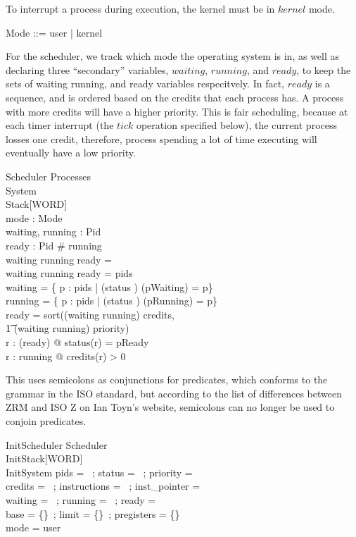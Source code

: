 \documentclass{article}
\begin{document}
To interrupt a process during execution, the kernel must be in $kernel$ mode.

\begin{zed}
  Mode ::= user | kernel
\end{zed}

For the scheduler, we track which mode the operating system is in, as
well as declaring three ``secondary'' variables, $waiting$, $running$,
and $ready$, to keep the sets of waiting running, and ready variables
respecitvely. In fact, $ready$ is a sequence, and is ordered based on
the credits that each process has. A process with more credits will
have a higher priority. This is fair scheduling, because at each timer
interrupt (the $tick$ operation specified below), the current process
losses one credit, therefore, process spending a lot of time executing
will eventually have a low priority.

\begin{schema}{Scheduler}
  Processes\\
  System\\
  Stack[WORD]\\
  mode : Mode\\
  waiting, running : \power Pid\\
  ready : \iseq Pid
\where
  \# running \\
  waiting \cap running \cap \ran ready = \emptyset\\
  waiting \cup running \cup \ran ready = pids\\
  waiting = \{ p : pids | (status \inv) (pWaiting) = p\}\\
  running = \{ p : pids | (status \inv) (pRunning) = p\}\\
  ready = sort((waiting \cup running) \ndres credits, \\
    \t1 (waiting \cup running) \ndres priority)\\
  \forall r : \ran(ready) @ status(r) = pReady\\
  \forall r : running @ credits(r) > 0
\end{schema}

This uses semicolons as conjunctions for predicates, which conforms to
the grammar in the ISO standard, but according to the list of
differences between ZRM and ISO Z on Ian Toyn's website, semicolons
can no longer be used to conjoin predicates.

\begin{schema}{InitScheduler}
    Scheduler\\
    InitStack[WORD]\\
    InitSystem
\where
    pids = \emptyset~; status = \emptyset~; priority = \emptyset\\
    credits = \emptyset~; instructions = \emptyset~; inst\_pointer = \emptyset\\
    waiting = \emptyset~; running = \emptyset~; ready = \langle \rangle\\
    base = \{\}~; limit = \{\}~; pregisters = \{\}\\
    mode = user
\end{schema}
\end{document}
